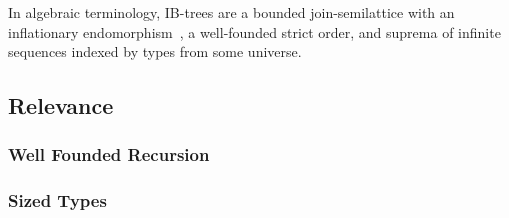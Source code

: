 In algebraic terminology, IB-trees are a bounded join-semilattice with an inflationary
endomorphism~\citep{TODO}, a well-founded strict order, and suprema of infinite sequences indexed by types from some universe.

\subsection{Relevance}

\subsubsection{Well Founded Recursion}

\subsubsection{Sized Types}

